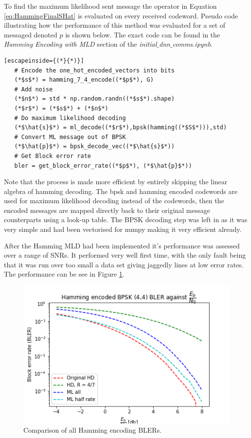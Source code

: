 \documentclass[12pt,onecolumn,letterpaper]{article}
\newcommand{\code}{\textit}
\begin{document}
To find the maximum likelihood sent message the operator in Equation \ref{eq:HammingFinalSHat} is evaluated on every received codeword. Pseudo code illustrating how the performance of this method was evaluated for a set of messaged denoted $p$ is shown below. The exact code can be found in the \textit{Hamming Encoding with MLD} section of the \code{initial$\_$dnn$\_$comms.ipynb}.

\begin{lstlisting}[escapeinside={(*}{*)}]
   # Encode the one_hot_encoded_vectors into bits
   (*$s$*) = hamming_7_4_encode((*$p$*), G)   
   # Add noise
   (*$n$*) = std * np.random.randn((*$s$*).shape)
   (*$r$*) = (*$s$*) + (*$n$*)
   # Do maximum likelihood decoding
   (*$\hat{s}$*) = ml_decode((*$r$*),bpsk(hamming((*$S$*))),std)
   # Convert ML message out of BPSK
   (*$\hat{p}$*) = bpsk_decode_vec((*$\hat{s}$*))
   # Get Block error rate
   bler = get_block_error_rate((*$p$*), (*$\hat{p}$*))
\end{lstlisting}

Note that the process is made more efficient by entirely skipping the linear algebra of hamming decoding. The bpsk and hamming encoded codewords are used for maximum likelihood decoding instead of the codewords, then the encoded messages are mapped directly back to their original message counterparts using a look-up table. The BPSK decoding step was left in as it was very simple and had been vectorised for numpy making it very efficient already. 

After the Hamming MLD had been implemented it's performance was assessed over a range of SNRs. It performed very well first time, with the only fault being that it was run over too small a data set giving jaggedly lines at low error rates. The performance can be see in Figure \ref{fig:HammingMldBlerAll}.

\begin{figure}
   \centering
   \includegraphics[width=0.6\linewidth]{figures/hamming_7_4_bler_vs_EbNo_comparison.png}
   \caption{Comparison of all Hamming encoding BLERs.}
   \label{fig:HammingMldBlerAll}
\end{figure}
\end{document}
